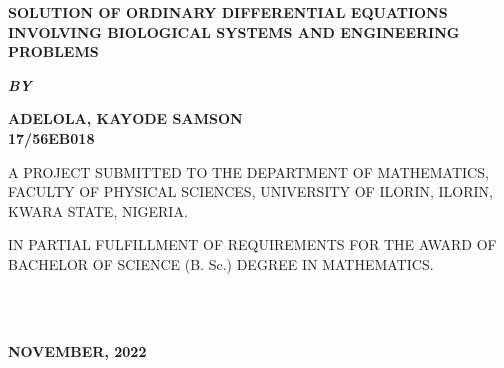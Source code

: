 \documentclass[11pt]{report}
\newcommand{\bt}[1]{\textbf{#1}}
\begin{document}
	
	\clearpage
	\thispagestyle{empty}
	\begin{center}
		\Large \bt{SOLUTION OF ORDINARY DIFFERENTIAL EQUATIONS INVOLVING BIOLOGICAL SYSTEMS AND ENGINEERING PROBLEMS}
	\end{center}

	\hspace{7cm}
	
	\begin{center}
		\textbf{\textit{BY}}
	\end{center}
	
	\hspace{5cm}
	
	\begin{center}
		\large \textbf{ADELOLA, KAYODE SAMSON
			\\
			17/56EB018}
	\end{center}
	
	\hspace{9cm}
	
	\begin{center}
		A PROJECT SUBMITTED TO THE DEPARTMENT OF MATHEMATICS, FACULTY OF PHYSICAL SCIENCES, UNIVERSITY OF ILORIN, ILORIN, KWARA STATE, NIGERIA.
	\end{center}

	\hspace{7cm}
	
	\begin{center}
		IN PARTIAL FULFILLMENT OF REQUIREMENTS FOR THE AWARD OF BACHELOR OF SCIENCE (B. Sc.) DEGREE IN MATHEMATICS.
	\end{center}
	\hspace{5cm}
	\\ \\ 
	\begin{center}
		\textbf{NOVEMBER, 2022}
	\end{center}

	\newpage
\end{document}
